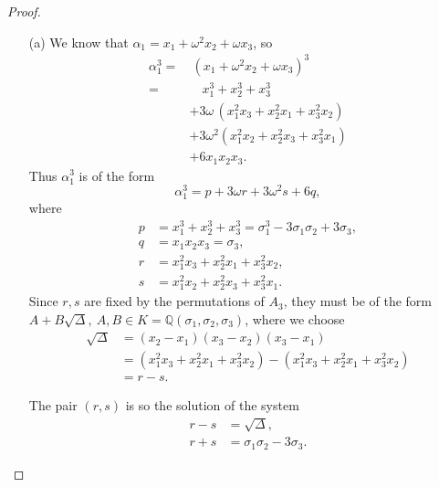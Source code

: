 \documentclass[11pt,a4paper]{article}
\newcommand{\Q}{\mathbb{Q}}
\begin{document}
\begin{proof}
\begin{enumerate}
\item[(a)]
We know that $\alpha_1 = x_1+\omega^2 x_2+\omega x_3$, so
\begin{align*}
\alpha_1^3 =&\ ( x_1+\omega^2 x_2+\omega x_3)^3\\
=&\quad x_1^3+x_2^3+x_3^3\\
&+3\omega\, (x_1^2x_3+x_2^2x_1+x_3^2x_2)\\
&+3\omega^2(x_1^2x_2+x_2^2x_3+x_3^2x_1)\\
&+6x_1x_2x_3.
\end{align*}
Thus  $\alpha_1^3$ is of the form
$$\alpha_1^3 = p + 3\omega r + 3 \omega^2 s + 6q,$$
where
\begin{align*} 
p &=x_1^3+x_2^3+x_3^3 = \sigma_1^3-3\sigma_1\sigma_2+3\sigma_3,\\
q &= x_1x_2x_3 = \sigma_3,\\
r&=x_1^2x_3+x_2^2x_1+x_3^2x_2,\\
s&=x_1^2x_2+x_2^2x_3+x_3^2x_1.
\end{align*}
Since $r,s$ are fixed by the permutations of $A_3$, they must be of the form $A+B\sqrt{\Delta}, \ A,B\in K = \Q(\sigma_1,\sigma_2,\sigma_3)$, where we choose
\begin{align*}
\sqrt{\Delta} &= (x_2-x_1)(x_3-x_2)(x_3-x_1)\\
&=(x_1^2x_3+x_2^2x_1+x_3^2x_2) -(x_1^2x_3+x_2^2x_1+x_3^2x_2)\\
&=r-s.
\end{align*}

The pair $(r,s)$ is so the solution of the system
\begin{align*}
r-s&=\sqrt{\Delta},\\
r+s &= \sigma_1\sigma_2 - 3 \sigma_3.
\end{align*}


\end{enumerate}
\end{proof}
\end{document}
